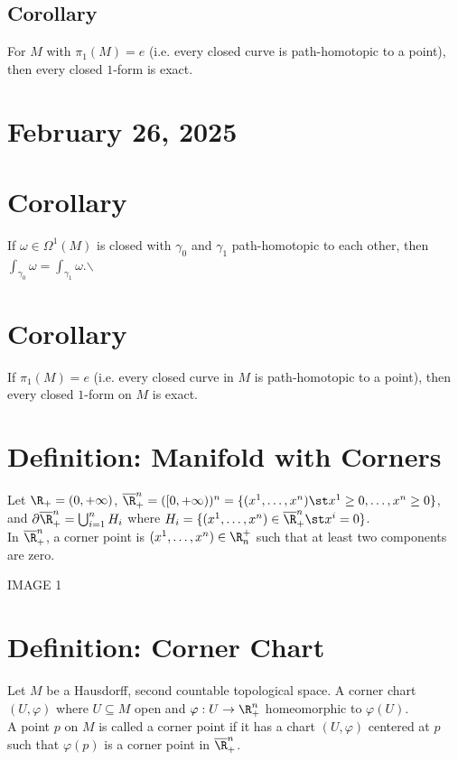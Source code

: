 \documentclass[11pt]{article}
\begin{document}
\subsection*{Corollary}
\label{sec:orgf5a453e}
For \(M\) with \(\pi_{1}(M)=e\) (i.e. every closed curve is path-homotopic to a point), then every closed \(1\)-form is exact.\\
\section*{February 26, 2025}
\label{sec:org35aa860}
\section*{Corollary}
\label{sec:org7bd7bf3}
If \(\omega\in\Omega^{1}(M)\) is closed with \(\gamma_{0}\) and \(\gamma_{1}\) path-homotopic to each other, then \(\int_{\gamma_{0}}\omega=\int_{\gamma_{1}}\omega\).$\backslash$\\
\section*{Corollary}
\label{sec:org2154d7c}
If \(\pi_{1}(M)=e\) (i.e. every closed curve in \(M\) is path-homotopic to a point), then every closed \(1\)-form on \(M\) is exact.\\
\section*{Definition: Manifold with Corners}
\label{sec:org5b9994d}
Let \(\R_{+}=(0,+\infty)\), \(\overline{\R}^{n}_{+}=([0,+\infty))^{n}=\{(x^{1},\ldots,x^{n})\st x^{1}\geq 0,\ldots,x^{n}\geq0\}\), and \(\partial\overline{\R}^{n}_{+}=\bigcup_{i=1}^{n}H_{i}\) where \(H_{i}=\{(x^{1},\ldots,x^{n})\in\overline{\R}^{n}_{+}\st x^{i}=0\}\).\\
In \(\overline{\R}^{n}_{+}\), a corner point is \((x^{1},\ldots,x^{n})\in\R^{+}_{n}\) such that at least two components are zero.\\
\begin{center}
IMAGE 1\\
\end{center}
\section*{Definition: Corner Chart}
\label{sec:orgf36316e}
Let \(M\) be a Hausdorff, second countable topological space. A corner chart \((U,\varphi)\) where \(U\subseteq M\) open and \(\varphi:U\to\R^{n}_{+}\) homeomorphic to \(\varphi(U)\).\\
A point \(p\) on \(M\) is called a corner point if it has a chart \((U,\varphi)\) centered at \(p\) such that \(\varphi(p)\) is a corner point in \(\overline{\R}^{n}_{+}\).\\
\end{document}
